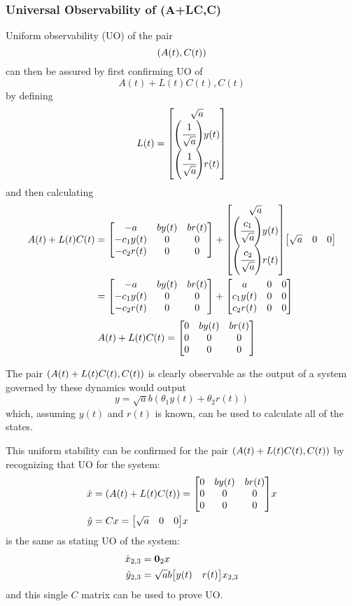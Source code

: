 \documentclass[letter]{article}
\begin{document}
\subsubsection{Universal Observability of (A+LC,C)}
Uniform observability (UO) of the pair $$\qty(A(t), C(t))$$ can then be assured by first confirming UO of $$A(t) + L(t) C(t), C(t)$$ by defining
\begin{equation}
	L(t) = \mqty[\sqrt{a}\\
				 \qty(\cfrac{1}{\sqrt{a}})y(t)\\
				 \qty(\cfrac{1}{\sqrt{a}})r(t)]
\end{equation}
and then calculating
\begin{align}
	A(t) + L(t) C(t)
	&= \mqty[-a & b y(t) & b r(t)\\
			-c_1 y(t) & 0 &0\\
			-c_2 r(t) & 0 &0]
	+ \mqty[\sqrt{a}\\
			\qty(\cfrac{c_1}{\sqrt{a}})y(t)\\
			\qty(\cfrac{c_2}{\sqrt{a}})r(t)]
	  \mqty[\sqrt{a} & 0 & 0]\\
	&= \mqty[-a & b y(t) & b r(t)\\
			-c_1 y(t) & 0 &0\\
			-c_2 r(t) & 0 &0]
	+  \mqty[a & 0 & 0\\
			c_1 y(t) & 0 &0\\
			c_2 r(t) & 0 &0]
\end{align}
\begin{align}
	A(t) + L(t) C(t)
	&= \mqty[0 & b y(t) & b r(t)\\
			0 & 0 &0\\
			0 & 0 &0]
\end{align}

The pair $\qty(A(t) + L(t) C(t), C(t))$ is clearly observable as the output of a system governed by these dynamics would output
\begin{equation}
	y = \sqrt{a} b (\theta_1 y(t) + \theta_2 r(t))
\end{equation}
which, assuming $y(t)$ and $r(t)$ is known, can be used to calculate all of the states.

This uniform stability can be confirmed for the pair $\qty(A(t) + L(t) C(t), C(t))$ by recognizing that UO for the system:
\begin{equation}
	\begin{aligned}
		\dot{x}
		&= (A(t) + L(t) C(t))
		= \mqty[0 & b y(t) & b r(t)\\
				0 & 0 &0\\
				0 & 0 &0] x\\
		\hat{y}
		&= C x = \mqty[\sqrt{a} & 0 & 0] x
	\end{aligned}
\end{equation}
is the same as stating UO of the system:
\begin{equation}
	\begin{aligned}
		\dot{x}_{2,3}
		&= \vb{0}_2 x\\
		\hat{y}_{2,3}
		&= \sqrt{a} b \mqty[y(t) & r(t)] x_{2,3}
	\end{aligned}
\end{equation}
and this single $C$ matrix can be used to prove UO.\\
\end{document}
